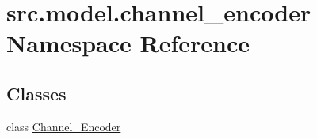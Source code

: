 \hypertarget{namespacesrc_1_1model_1_1channel__encoder}{}\section{src.\+model.\+channel\+\_\+encoder Namespace Reference}
\label{namespacesrc_1_1model_1_1channel__encoder}
\subsection*{Classes}
\begin{DoxyCompactItemize}
\item 
class \hyperlink{classsrc_1_1model_1_1channel__encoder_1_1Channel__Encoder}{Channel\+\_\+\+Encoder}
\end{DoxyCompactItemize}

